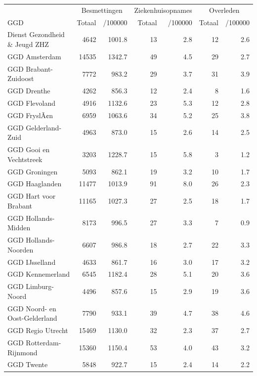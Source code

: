 \documentclass[
  english,
  man,floatsintext]{apa6}
\begin{document}
\begin{table}
\centering\begingroup\fontsize{10}{12}\selectfont

\begin{threeparttable}
\begin{tabular}{lrrrrrr}
\toprule
\multicolumn{1}{c}{ } & \multicolumn{2}{c}{Besmettingen} & \multicolumn{2}{c}{Ziekenhuisopnames} & \multicolumn{2}{c}{Overleden} \\
\cmidrule(l{3pt}r{3pt}){2-3} \cmidrule(l{3pt}r{3pt}){4-5} \cmidrule(l{3pt}r{3pt}){6-7}
GGD & Totaal & /100000 & Totaal & /100000 & Totaal & /100000\\
\midrule
Dienst Gezondheid \& Jeugd ZHZ & 4642 & 1001.8 & 13 & 2.8 & 12 & 2.6\\
GGD Amsterdam & 14535 & 1342.7 & 49 & 4.5 & 29 & 2.7\\
GGD Brabant-Zuidoost & 7772 & 983.2 & 29 & 3.7 & 31 & 3.9\\
GGD Drenthe & 4262 & 856.3 & 12 & 2.4 & 8 & 1.6\\
GGD Flevoland & 4916 & 1132.6 & 23 & 5.3 & 12 & 2.8\\
GGD FryslÃ¢n & 6959 & 1063.6 & 34 & 5.2 & 25 & 3.8\\
GGD Gelderland-Zuid & 4963 & 873.0 & 15 & 2.6 & 14 & 2.5\\
GGD Gooi en Vechtstreek & 3203 & 1228.7 & 15 & 5.8 & 3 & 1.2\\
GGD Groningen & 5093 & 862.1 & 19 & 3.2 & 10 & 1.7\\
GGD Haaglanden & 11477 & 1013.9 & 91 & 8.0 & 26 & 2.3\\
GGD Hart voor Brabant & 11165 & 1027.3 & 27 & 2.5 & 18 & 1.7\\
GGD Hollands-Midden & 8173 & 996.5 & 27 & 3.3 & 7 & 0.9\\
GGD Hollands-Noorden & 6607 & 986.8 & 18 & 2.7 & 22 & 3.3\\
GGD IJsselland & 4633 & 861.7 & 16 & 3.0 & 17 & 3.2\\
GGD Kennemerland & 6545 & 1182.4 & 28 & 5.1 & 20 & 3.6\\
GGD Limburg-Noord & 4496 & 857.6 & 15 & 2.9 & 19 & 3.6\\
GGD Noord- en Oost-Gelderland & 7790 & 933.1 & 39 & 4.7 & 38 & 4.6\\
GGD Regio Utrecht & 15469 & 1130.0 & 32 & 2.3 & 37 & 2.7\\
GGD Rotterdam-Rijnmond & 15360 & 1150.4 & 53 & 4.0 & 43 & 3.2\\
GGD Twente & 5848 & 922.7 & 15 & 2.4 & 14 & 2.2\\

\end{tabular}
\end{threeparttable}
\end{table}
\end{document}
